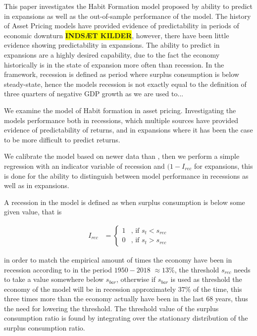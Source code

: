 This paper investigates the Habit Formation model proposed by \cite{Campbell1999} ability to predict in expansions as well as the out-of-sample performance of the model. 
The history of Asset Pricing models have provided evidence of predictability in periods of economic downturn \colorbox{yellow}{\textbf{INDSÆT KILDER}}, however, there have been little evidence showing predictability in expansions. The ability to predict in expansions are a highly desired capability, due to the fact the economy historically is in the state of expansion more often than recession. In the \cite{Campbell1999} framework, recession is defined as period where surplus consumption is below steady-state, hence the models recession is not exactly equal to the definition of three quarters of negative GDP growth as we are used to...


\hline

We examine the \cite{Campbell1999} model of Habit formation in asset pricing. Investigating the models performance both in recessions, which multiple sources have provided evidence of predictability of returns, and in expansions where it has been the case to be more difficult to predict returns. 

We calibrate the model based on newer data than \cite{Campbell1999}, then we perform a simple regression with an indicator variable of recession and $(1-I_{rec}$ for expansions, this is done for the ability to distinguish between model performance in recessions as well as in expansions. 

A recession in the model is defined as when surplus consumption is below some given value, that is 

    \begin{align}
        I_{rec} & = \begin{cases} 1 & \text{, if } s_t < s_{rec} \\
                                  0 & \text{, if } s_t > s_{rec} 
                    \end{cases}
    \end{align}

in order to match the empirical amount of times the economy have been in recession according to \cite{USREC} in the period $1950 - 2018$ $\approx 13 \%$, the threshold $s_{rec}$ needs to take a value somewhere below $s_{bar}$, otherwise if $s_{bar}$ is used as threshold the economy of the model will be in recession approximately $37\%$ of the time, this three times more than the economy actually have been in the last 68 years, thus the need for lowering the threshold. The threshold value of the surplus consumption ratio is found by integrating over the stationary distribution of the surplus consumption ratio.



\clearpage
